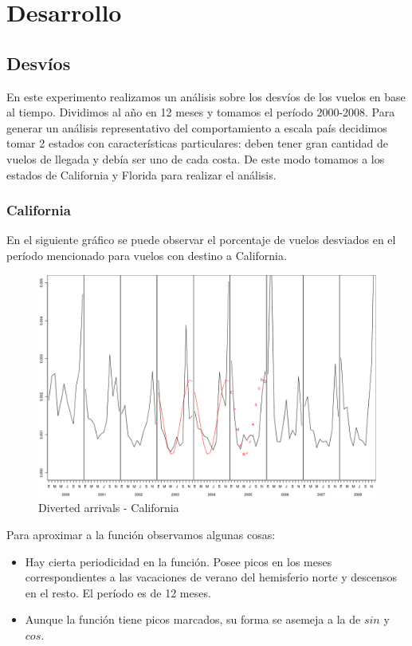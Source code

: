 \section{Desarrollo}
\subsection{Desv\'ios}

En este experimento realizamos un análisis sobre los desvíos de los vuelos en base al tiempo. Dividimos al año en 12 meses y tomamos el período 2000-2008. Para generar un análisis representativo del comportamiento a escala país decidimos tomar 2 estados con características particulares: deben tener gran cantidad de vuelos de llegada y debía ser uno de cada costa. De este modo tomamos a los estados de California y Florida para realizar el análisis.

\subsubsection{California}

En el siguiente gráfico se puede observar el porcentaje de vuelos desviados en el período mencionado para vuelos con destino a California.

\begin{figure}[h!]
  \begin{center}
	\includegraphics[scale=0.5]{img/plot_CA_2003-2005.png}
	\caption{Diverted arrivals - California}
  \end{center}
\end{figure}

Para aproximar a la función observamos algunas cosas:
\begin{itemize}  
\item Hay cierta periodicidad en la función. Posee picos en los meses correspondientes a las vacaciones de verano del hemisferio norte y descensos en el resto. El período es de 12 meses.
\item Aunque la función tiene picos marcados, su forma se asemeja a la de $sin$ y $cos$.
\end{itemize}

